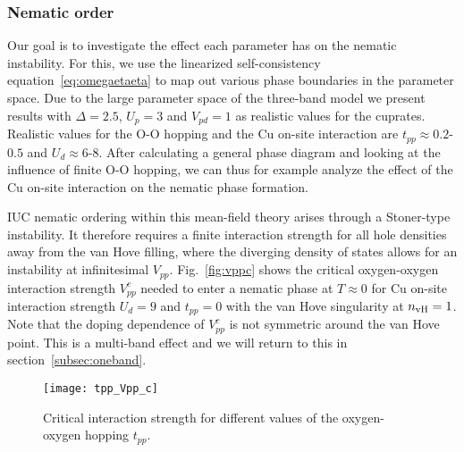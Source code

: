 \documentclass[prb, twocolumn,showpacs,preprintnumbers,amsmath,amssymb, floatfix]{revtex4}
\begin{document}
\subsubsection{Nematic order}
Our goal is to investigate the effect each parameter has on the
nematic instability. 
For this, we use the linearized self-consistency
equation~\eqref{eq:omegaetaeta}
to map out various phase boundaries in the parameter space. 
Due to the large parameter space of the three-band model
we
present results with 
$\Delta=2.5$, $U_{p} = 3$ and $V_{pd}=1$ as realistic values for the
cuprates. 
Realistic values for the O-O hopping and the Cu on-site interaction
are $t_{pp}\approx 0.2$-$0.5$ and $U_{d}\approx
6$-$8$.\cite{mcmahan:90, hybertsen:89} After calculating a general phase diagram and looking at the influence of finite O-O hopping, we can thus for example analyze the effect of the Cu on-site interaction on the nematic phase formation.

IUC nematic ordering within this mean-field theory arises through a Stoner-type instability. It therefore requires a finite
interaction strength for all hole densities away from the van
Hove filling, where the diverging density of states allows for an
instability at infinitesimal $V_{pp}$.
Fig.~\ref{fig:vppc} shows the critical oxygen-oxygen
interaction strength  $V_{pp}^c$ needed to enter a nematic phase at
$T\approx0$ for  Cu on-site interaction strength $U_d = 9$ and
$t_{pp}=0$ with the van Hove singularity at $n_{\rm vH}=1$.
Note that the doping dependence of $V_{pp}^c$ is not symmetric around
the van Hove point. This is a multi-band effect and we will return to this in
section~\ref{subsec:oneband}.

\begin{figure}[bt]
  \begin{center}
    \texttt{[image: tpp\_Vpp\_c]}
  \end{center}
  \caption{Critical interaction strength for different values of the oxygen-oxygen hopping $t_{pp}$.}
  \label{fig:vctpp}
\end{figure}
\end{document}
